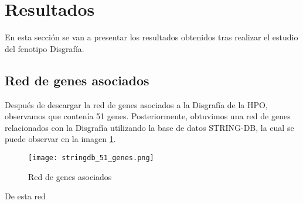
\section{Resultados}

\graphicspath{ {../code/} }

En esta sección se van a presentar los resultados obtenidos tras realizar el estudio del fenotipo Disgrafía.

\subsection{Red de genes asociados}

Después de descargar la red de genes asociados a la Disgrafía de la HPO, observamos que contenía 51 genes. Posteriormente, obtuvimos una red de genes relacionados con la Disgrafía utilizando la base de datos STRING-DB, la cual se puede observar en la imagen \ref{fig:genesAsociados}.

\begin{figure}[h!]
	\centering
	\texttt{[image: stringdb\_51\_genes.png]}
	\caption{Red de genes asociados}
	\label{fig:genesAsociados}
\end{figure}

De esta red 